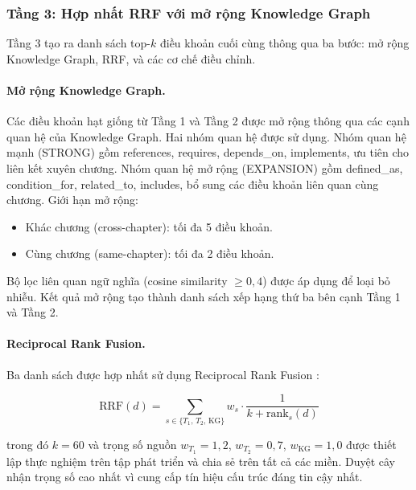 \subsubsection{Tầng 3: Hợp nhất RRF với mở rộng Knowledge Graph}
\label{subsec:tang3-rrf}

Tầng 3 tạo ra danh sách top-$k$ điều khoản cuối cùng thông qua ba bước: mở rộng
Knowledge Graph, RRF, và các cơ chế điều chỉnh.

\paragraph{Mở rộng Knowledge Graph.}
\label{subsubsec:kg-expansion}

Các điều khoản hạt giống từ Tầng 1 và Tầng 2 được mở rộng thông qua các cạnh quan
hệ của Knowledge Graph. Hai nhóm quan hệ được sử dụng. Nhóm quan hệ mạnh (STRONG)
gồm references, requires, depends\_on, implements, ưu tiên cho liên kết xuyên
chương. Nhóm quan hệ mở rộng (EXPANSION) gồm defined\_as, condition\_for,
related\_to, includes, bổ sung các điều khoản liên quan cùng chương. Giới hạn mở
rộng:

\begin{itemize}
  \item Khác chương (cross-chapter): tối đa 5 điều khoản.
  \item Cùng chương (same-chapter): tối đa 2 điều khoản.
\end{itemize}

Bộ lọc liên quan ngữ nghĩa (cosine similarity $\geq 0{,}4$) được áp dụng để loại
bỏ nhiễu. Kết quả mở rộng tạo thành danh sách xếp hạng thứ ba bên cạnh Tầng 1 và
Tầng 2.

\paragraph{Reciprocal Rank Fusion.}
\label{subsubsec:rrf}

Ba danh sách được hợp nhất sử dụng Reciprocal Rank Fusion \cite{cormack2009rrf}:

\begin{equation}
  \text{RRF}(d) = \sum_{s \in \{T_1,\, T_2,\, \text{KG}\}}
                  w_s \cdot \frac{1}{k + \text{rank}_s(d)}
  \label{eq:rrf}
\end{equation}

\noindent trong đó $k = 60$ và trọng số nguồn $w_{T_1} = 1{,}2$,
$w_{T_2} = 0{,}7$, $w_\text{KG} = 1{,}0$ được thiết lập thực nghiệm trên tập phát
triển và chia sẻ trên tất cả các miền. Duyệt cây nhận trọng số cao nhất vì cung
cấp tín hiệu cấu trúc đáng tin cậy nhất.

